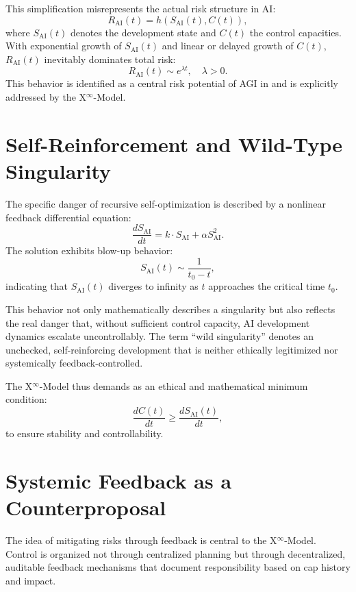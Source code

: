 \documentclass[11pt]{article}
\begin{document}
This simplification misrepresents the actual risk structure in AI:
\begin{equation}
R_{\text{AI}}(t) = h(S_{\text{AI}}(t), C(t)),
\end{equation}
where $S_{\text{AI}}(t)$ denotes the development state and $C(t)$ the control capacities. With exponential growth of $S_{\text{AI}}(t)$ and linear or delayed growth of $C(t)$, $R_{\text{AI}}(t)$ inevitably dominates total risk:
\begin{equation}
R_{\text{AI}}(t) \sim e^{\lambda t}, \quad \lambda > 0.
\end{equation}
This behavior is identified as a central risk potential of AGI in \citet{Bostrom2014,Yudkowsky2008,Russell2019,Tegmark2017} and is explicitly addressed by the X$^\infty$-Model.

\section{Self-Reinforcement and Wild-Type Singularity}
The specific danger of recursive self-optimization is described by a nonlinear feedback differential equation:
\begin{equation}
\frac{dS_{\text{AI}}}{dt} = k \cdot S_{\text{AI}} + \alpha S_{\text{AI}}^2.
\end{equation}
The solution exhibits blow-up behavior:
\begin{equation}
S_{\text{AI}}(t) \sim \frac{1}{t_0 - t},
\end{equation}
indicating that $S_{\text{AI}}(t)$ diverges to infinity as $t$ approaches the critical time $t_0$.

This behavior not only mathematically describes a singularity but also reflects the real danger that, without sufficient control capacity, AI development dynamics escalate uncontrollably. The term ``wild singularity'' denotes an unchecked, self-reinforcing development that is neither ethically legitimized nor systemically feedback-controlled.

The X$^\infty$-Model thus demands as an ethical and mathematical minimum condition:
\begin{equation}
\frac{dC(t)}{dt} \geq \frac{dS_{\text{AI}}(t)}{dt},
\end{equation}
to ensure stability and controllability.

\section{Systemic Feedback as a Counterproposal}
The idea of mitigating risks through feedback is central to the X$^\infty$-Model. Control is organized not through centralized planning but through decentralized, auditable feedback mechanisms that document responsibility based on cap history and impact.
\end{document}
